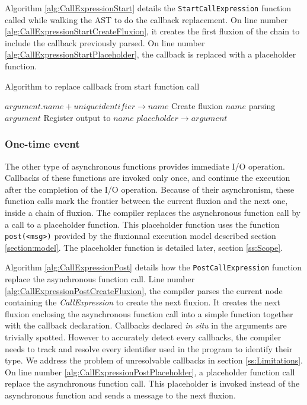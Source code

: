 Algorithm \ref{alg:CallExpressionStart} details the \texttt{StartCallExpression} function called while walking the AST to do the callback replacement.
On line number \ref{alg:CallExpressionStartCreateFluxion}, it creates the first fluxion of the chain to include the callback previously parsed.
On line number \ref{alg:CallExpressionStartPlaceholder}, the callback is replaced with a placeholder function.

\begin{algorithm}
\caption{Algorithm to replace callback from start function call}
\label{alg:CallExpressionStart}
\begin{algorithmic}[1]
\State $argument.name + unique identifier \to name$
\State Create fluxion $name$ parsing $argument$ \label{alg:CallExpressionStartCreateFluxion}
\State Register output to $name$
\State $placeholder \to argument$ \label{alg:CallExpressionStartPlaceholder}
\EndIf
\EndFor
\EndFunction
\end{algorithmic}
\end{algorithm}

\subsubsection{One-time event} \label{sss:post}

The other type of asynchronous functions provides immediate I/O operation.
Callbacks of these functions are invoked only once, and continue the execution after the completion of the I/O operation.
Because of their asynchronism, these function calls mark the frontier between the current fluxion and the next one, inside a chain of fluxion.
The compiler replaces the asynchronous function call by a call to a placeholder function.
This placeholder function uses the function \texttt{post(<msg>)} provided by the fluxionnal execution model described section \ref{section:model}.
The placeholder function is detailed later, section \ref{ss:Scope}.

Algorithm \ref{alg:CallExpressionPost} details how the \texttt{PostCallExpression} function replace the asynchronous function call.
Line number \ref{alg:CallExpressionPostCreateFluxion}, the compiler parses the current node containing the \textit{CallExpression} to create the next fluxion.
It creates the next fluxion enclosing the asynchronous function call into a simple function together with the callback declaration.
Callbacks declared \textit{in situ} in the arguments are trivially spotted.
However to accurately detect every callbacks, the compiler needs to track and resolve every identifier used in the program to identify their type.
We address the problem of unresolvable callbacks in section \ref{ss:Limitations}.
On line number \ref{alg:CallExpressionPostPlaceholder}, a placeholder function call replace the asynchronous function call.
This placeholder is invoked instead of the asynchronous function and sends a message to the next fluxion.

